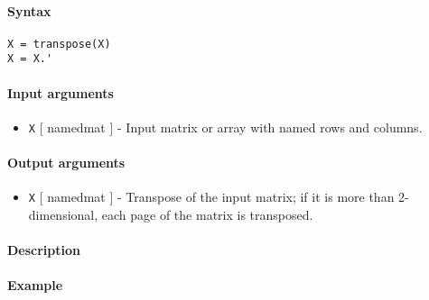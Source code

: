 


	\paragraph{Syntax}

\begin{verbatim}
X = transpose(X)
X = X.'
\end{verbatim}

\paragraph{Input arguments}

\begin{itemize}
\itemsep1pt\parskip0pt
\item
  \texttt{X} {[} namedmat {]} - Input matrix or array with named rows
  and columns.
\end{itemize}

\paragraph{Output arguments}

\begin{itemize}
\itemsep1pt\parskip0pt
\item
  \texttt{X} {[} namedmat {]} - Transpose of the input matrix; if it is
  more than 2-dimensional, each page of the matrix is transposed.
\end{itemize}

\paragraph{Description}

\paragraph{Example}


